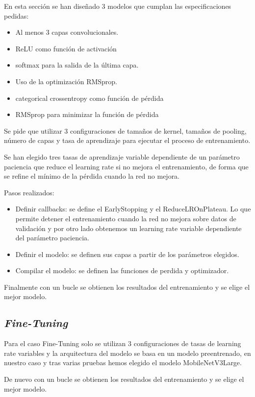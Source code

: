 En esta sección se han diseñado 3 modelos que cumplan las especificaciones pedidas:
\begin{itemize}
    \item Al menos 3 capas convolucionales.
    \item ReLU como función de activación
    \item softmax para la salida de la última capa.
    \item Uso de la optimización RMSprop.
    \item categorical crossentropy como función de pérdida
    \item RMSprop para minimizar la función de pérdida
\end{itemize}



Se pide que utilizar 3 configuraciones de tamaños de kernel, tamaños de pooling, número de capas y tasa de aprendizaje para ejecutar el proceso de entrenamiento.

Se han elegido tres tasas de aprendizaje variable dependiente de un parámetro paciencia que reduce el learning rate si no mejora el entrenamiento, de forma que se refine el mínimo de la pérdida cuando la red no mejora.

Pasos realizados:

\begin{itemize}
    \item Definir callbacks: se define el EarlyStopping y el ReduceLROnPlateau. Lo que permite detener el entrenamiento cuando la red no mejora sobre datos de validación y por otro lado obtenemos un learning rate variable dependiente del parámetro paciencia.
    \item Definir el modelo: se definen sus capas a partir de los parámetros elegidos.
    \item Compilar el modelo: se definen las funciones de perdida y optimizador.
\end{itemize}

Finalmente con un bucle se obtienen los resultados del entrenamiento y se elige el mejor modelo.

\subsection{\textit{Fine-Tuning}}
Para el caso Fine-Tuning solo se utilizan 3 configuraciones de tasas de learning rate variables
y la arquitectura del modelo se basa en un modelo preentrenado, en nuestro caso y tras varias pruebas hemos elegido el modelo MobileNetV3Large.

De nuevo con un bucle se obtienen los resultados del entrenamiento y se elige el mejor modelo. 


